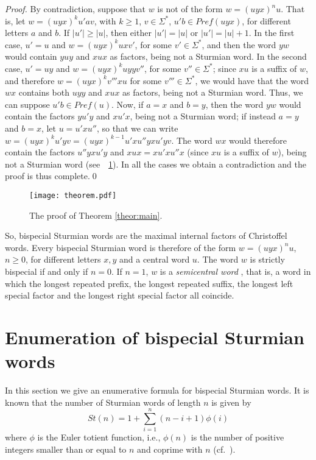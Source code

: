 \documentclass{llncs}
\newcommand{\Pref}{\textit{Pref}}
\begin{document}
\begin{proof}
 By contradiction, suppose that $w$ is not of the form $w=(uyx)^{n}u$. That is, let $w=(uyx)^{k}u'av$, with $k\ge 1$, $v\in \Sigma^{*}$, $u'b\in \Pref(uyx)$, for different letters $a$ and $b$. If $|u'|\ge |u|$, then either $|u'|=|u|$ or $|u'|=|u|+1$. In the first case, $u'=u$ and $w=(uyx)^{k}uxv'$, for some $v'\in \Sigma^{*}$, and then the word $yw$ would contain $yuy$ and $xux$ as factors, being not a Sturmian word. In the second case, $u'=uy$ and $w=(uyx)^{k}uyyv''$, for some $v''\in \Sigma^{*}$; since $xu$ is a suffix of $w$, and therefore $w=(uyx)^{k}v'''xu$ for some $v'''\in \Sigma^{*}$, we would have that the word $wx$ contains both $uyy$ and $xux$ as factors, being not a Sturmian word. Thus, we can suppose $u'b\in \Pref(u)$. Now, if $a=x$ and $b=y$, then the word $yw$ would contain the factors $yu'y$ and $xu'x$, being not a Sturmian word; if instead $a=y$ and $b=x$, let $u=u'xu''$, so that we can write $w=(uyx)^{k}u'yv=(uyx)^{k-1}u'xu''yxu'yv$. The word $wx$ would therefore contain the factors $u''yxu'y$ and $xux=xu'xu''x$ (since $xu$ is a suffix of $w$), being not a Sturmian word (see~\figurename~\ref{fig:theorem}). In all the cases we obtain a contradiction and the proof is thus complete.\qed
\end{proof}

\begin{figure}[ht]
\begin{center}
\texttt{[image: theorem.pdf]}
\caption{The proof of Theorem \ref{theor:main}.}
\label{fig:theorem}
\end{center}
\end{figure}

So, bispecial Sturmian words are the maximal internal factors of Christoffel words. Every bispecial Sturmian word is therefore of the form $w=(uyx)^{n}u$, $n\ge 0$, for different letters $x,y$ and a central word $u$. The word $w$ is strictly bispecial if and only if $n=0$. If $n=1$, $w$ is a \emph{semicentral word} \cite{BuDelFi12}, that is, a word in which the longest repeated prefix, the longest repeated suffix, the longest left special factor and the longest right special factor all coincide.

\section{Enumeration of bispecial Sturmian words}\label{sec:En}


In this section we give an enumerative formula for bispecial Sturmian words. It is known that the number of Sturmian words of length $n$ is given by
\[St(n)=1+\sum_{i=1}^{n}(n-i+1)\phi(i)\]
where $\phi$ is the Euler totient function, i.e., $\phi(n)$ is the number of positive integers smaller than or equal to $n$ and coprime with $n$ (cf.~\cite{Mig91,Lip82}).
\end{document}
